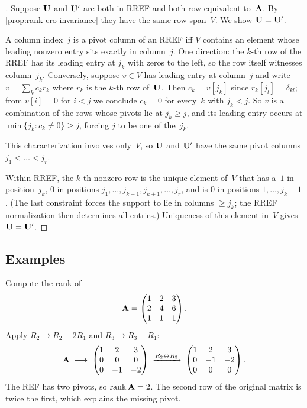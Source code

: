 \begin{proof}[]
Suppose $\mathbf{U}$ and $\mathbf{U}'$ are both in RREF and both
row-equivalent to~$\mathbf{A}$. By \cref{prop:rank-ero-invariance} they
have the same row span~$V$. We show $\mathbf{U} = \mathbf{U}'$.

A column index~$j$ is a pivot column of an RREF iff $V$ contains an
element whose leading nonzero entry sits exactly in column~$j$. One
direction: the $k$-th row of the RREF has its leading entry at $j_k$
with zeros to the left, so the row itself witnesses column~$j_k$.
Conversely, suppose $v \in V$ has leading entry at column~$j$ and write
$v = \sum_k c_k r_k$ where $r_k$ is the $k$-th row of~$\mathbf{U}$. Then
$c_k = v[j_k]$ since $r_k[j_l] = \delta_{kl}$; from $v[i] = 0$ for
$i < j$ we conclude $c_k = 0$ for every~$k$ with $j_k < j$. So $v$ is
a combination of the rows whose pivots lie at $j_k \ge j$, and its
leading entry occurs at $\min\{j_k : c_k \neq 0\} \ge j$, forcing $j$
to be one of the~$j_k$.

This characterization involves only~$V$, so $\mathbf{U}$ and $\mathbf{U}'$
have the same pivot columns $j_1 < \dots < j_r$.

Within RREF, the $k$-th nonzero row is the unique element of~$V$ that
has a~$1$ in position~$j_k$, $0$ in positions $j_1, \dots, j_{k-1},
j_{k+1}, \dots, j_r$, and is $0$ in positions $1, \dots, j_k - 1$. (The
last constraint forces the support to lie in columns $\ge j_k$; the
RREF normalization then determines all entries.) Uniqueness of this
element in~$V$ gives $\mathbf{U} = \mathbf{U}'$.
\end{proof}

\subsection*{Examples}

\begin{example}
\label{ex:rank-compute}
Compute the rank of
\[
  \mathbf{A} = \begin{pmatrix}
    1 & 2 & 3 \\
    2 & 4 & 6 \\
    1 & 1 & 1
  \end{pmatrix}.
\]
Apply $R_2 \to R_2 - 2R_1$ and $R_3 \to R_3 - R_1$:
\[
  \mathbf{A} \;\longrightarrow\;
  \begin{pmatrix}
    1 & 2 & 3 \\
    0 & 0 & 0 \\
    0 & -1 & -2
  \end{pmatrix}
  \;\xrightarrow{R_2 \leftrightarrow R_3}\;
  \begin{pmatrix}
    1 & 2 & 3 \\
    0 & -1 & -2 \\
    0 & 0 & 0
  \end{pmatrix}.
\]
The REF has two pivots, so $\operatorname{rank} \mathbf{A} = 2$. The second row of the
original matrix is twice the first, which explains the missing pivot.
\end{example}

